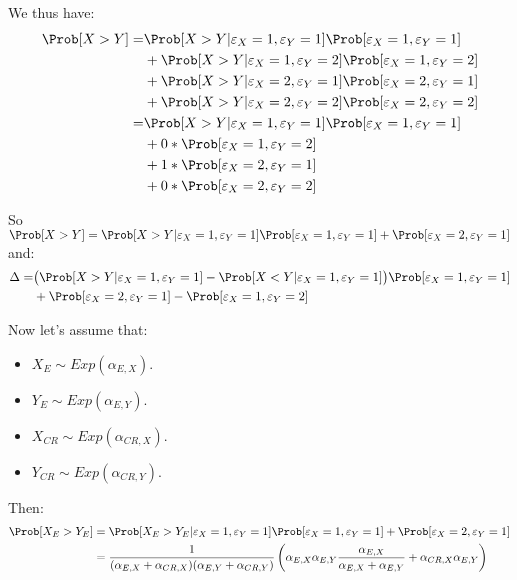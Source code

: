 \documentclass[12pt]{article}
\begin{document}
\bigskip

We thus have:
\begin{align*}
\Prob[X > Y] 
= & \Prob[X > Y|\varepsilon_X=1,\varepsilon_Y=1]\Prob[\varepsilon_X=1,\varepsilon_Y=1] \\
&+ \Prob[X > Y|\varepsilon_X=1,\varepsilon_Y=2]\Prob[\varepsilon_X=1,\varepsilon_Y=2] \\
&+ \Prob[X > Y|\varepsilon_X=2,\varepsilon_Y=1]\Prob[\varepsilon_X=2,\varepsilon_Y=1] \\
&+ \Prob[X > Y|\varepsilon_X=2,\varepsilon_Y=2]\Prob[\varepsilon_X=2,\varepsilon_Y=2] \\
= & \Prob[X > Y|\varepsilon_X=1,\varepsilon_Y=1]\Prob[\varepsilon_X=1,\varepsilon_Y=1] \\
&+ 0*\Prob[\varepsilon_X=1,\varepsilon_Y=2] \\
&+ 1*\Prob[\varepsilon_X=2,\varepsilon_Y=1] \\
&+ 0*\Prob[\varepsilon_X=2,\varepsilon_Y=2] \\
\end{align*}

So \(\Prob[X > Y] = \Prob[X >
Y|\varepsilon_X=1,\varepsilon_Y=1]\Prob[\varepsilon_X=1,\varepsilon_Y=1] +
\Prob[\varepsilon_X=2,\varepsilon_Y=1]\) and:
\begin{align*}
\Delta = &
 \big(\Prob[X > Y|\varepsilon_X=1,\varepsilon_Y=1] - \Prob[X < Y|\varepsilon_X=1,\varepsilon_Y=1] \big) \Prob[\varepsilon_X=1,\varepsilon_Y=1] \\
& + \Prob[\varepsilon_X=2,\varepsilon_Y=1] - \Prob[\varepsilon_X=1,\varepsilon_Y=2]
\end{align*}

Now let's assume that:
\begin{itemize}
\item \(X_{E} \sim Exp(\alpha_{E,X})\).
\item \(Y_{E} \sim Exp(\alpha_{E,Y})\).
\item \(X_{CR} \sim Exp(\alpha_{CR,X})\).
\item \(Y_{CR} \sim Exp(\alpha_{CR,Y})\).
\end{itemize}

Then:
\begin{align*}
 \Prob[X_{E} > Y_{E}] &= \Prob[X_{E} >
Y_{E}|\varepsilon_X=1,\varepsilon_Y=1]\Prob[\varepsilon_X=1,\varepsilon_Y=1] +
\Prob[\varepsilon_X=2,\varepsilon_Y=1] \\
&= \frac{1}{(\alpha_{E,X}+\alpha_{CR,X})(\alpha_{E,Y}+\alpha_{CR,Y})} \left(
 \alpha_{E,X}\alpha_{E,Y} \frac{\alpha_{E,X}}{\alpha_{E,X}+\alpha_{E,Y}}
+ \alpha_{CR,X}\alpha_{E,Y} \right) \\
\end{align*}
\end{document}
